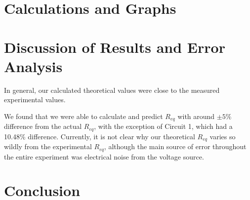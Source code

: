 \documentclass[12pt,letterpaper,titlepage]{report}
\begin{document}

\bigskip
\section*{Calculations and Graphs}

\begin{minipage}{\linewidth}
\centering
{}

\end{minipage}

\bigskip
\bigskip

\begin{minipage}{\linewidth}
\centering
{}

\end{minipage}



\bigskip
\section*{Discussion of Results and Error Analysis}

In general, our calculated theoretical values were close to the measured experimental values.

\medskip

We found that we were able to calculate and predict $R_{eq}$ with around $\pm 5\%$ difference from the actual $R_{eq}$, with the exception of Circuit 1, which had a 10.48\% difference. Currently, it is not clear why our theoretical $R_{eq}$ varies so wildly from the experimental $R_{eq}$, although the main source of error throughout the entire experiment was electrical noise from the voltage source.



\bigskip
\section*{Conclusion}


\end{document}
